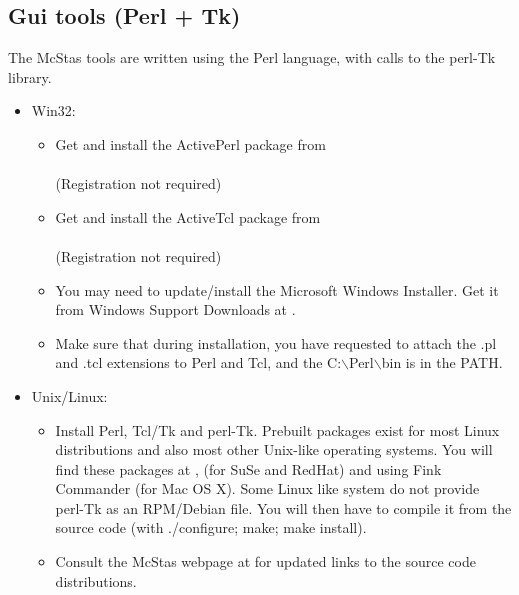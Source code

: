 \subsection{Gui tools (Perl + Tk)}
\label{s:perltk}

The McStas tools are written using the Perl language, with calls to the perl-Tk library.

\begin{itemize}
\item{Win32:}
  \begin{itemize}
  \item{Get and install the ActivePerl package from\\
      \\(Registration
      not required)}
  \item{Get and install the ActiveTcl package from\\
      \\(Registration
      not required)}
  \item{You may need to update/install the Microsoft Windows Installer. Get it from Windows Support Downloads at .}
  \item{Make sure that during installation, you have requested to attach the .pl and .tcl extensions to Perl and Tcl, and the C:$\backslash$Perl$\backslash$bin is in the PATH.}
  \end{itemize}
\item{Unix/Linux:}
  \begin{itemize}
    \item{Install Perl, Tcl/Tk and perl-Tk. Prebuilt packages exist for
      most Linux distributions and also most other Unix-like operating
      systems. You will find these packages at ,  (for SuSe and RedHat) and using Fink Commander (for Mac OS X). Some Linux like system do not provide perl-Tk as an RPM/Debian file. You will then have to compile it from the source code (with ./configure; make; make install).}
    \item{Consult the McStas webpage at  for updated links to the source code distributions.}
    \end{itemize}
  \end{itemize}
  
